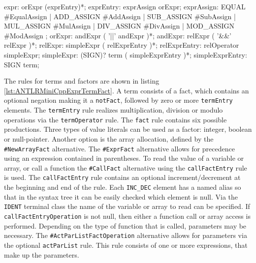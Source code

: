 \begin{AntlrCode}[float,numbers=none,caption=Expression rules for assignment and boolean operations of the MiniC++ ANTLR grammar., label=lst:ANTLRMiniCppExprBool]
expr:                 orExpr (exprEntry)*;
exprEntry:            exprAssign orExpr;
exprAssign:           EQUAL      #EqualAssign
                    | ADD_ASSIGN #AddAssign
                    | SUB_ASSIGN #SubAssign
                    | MUL_ASSIGN #MulAssign
                    | DIV_ASSIGN #DivAssign
                    | MOD_ASSIGN #ModAssign
                    ;
orExpr:             andExpr ( '||' andExpr )*;
andExpr:            relExpr ( '&&' relExpr )*;
relExpr:            simpleExpr
                    ( relExprEntry )*;
relExprEntry:       relOperator simpleExpr;
simpleExpr:         (SIGN)?
                    term ( simpleExprEntry )*;
simpleExprEntry:    SIGN term;
\end{AntlrCode}

The rules for terms and factors are shown in listing \ref{lst:ANTLRMiniCppExprTermFact}. A term consists of a fact, which contains an optional negation making it a \verb|notFact|, followed by zero or more \verb|termEntry| elements. The \verb|termEntry| rule realizes multiplication, division or modulo operations via the \verb|termOperator| rule. The \verb|fact| rule contains six possible productions. Three types of value literals can be used as a factor: integer, boolean or null-pointer. Another option is the array allocation, defined by the \verb|#NewArrayFact| alternative. The \verb|#ExprFact| alternative allows for precedence using an expression contained in parentheses. To read the value of a variable or array, or call a function the \verb|#CallFact| alternative using the \verb|callFactEntry| rule is used. The \verb|callFactEntry| rule contains an optional increment/decrement at the beginning and end of the rule. Each \verb|INC_DEC| element has a named alias so that in the syntax tree it can be easily checked which element is null. Via the \verb|IDENT| terminal class the name of the variable or array to read can be specified. If \verb|callFactEntryOperation| is not null, then either a function call or array access is performed. Depending on the type of function that is called, parameters may be necessary. The \verb|#ActParListFactOperation| alternative allows for parameters via the optional \verb|actParList| rule. This rule consists of one or more expressions, that make up the parameters.     

